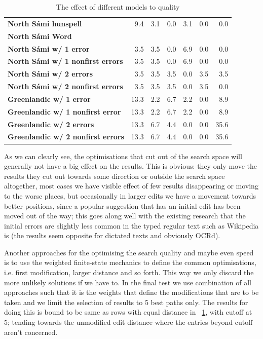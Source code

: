 \documentclass[a4paper,12pt]{article}
\begin{document}
\begin{table}
\begin{tabular}{|l|r|r|r|r|r|r|}
        \bf North Sámi hunspell & 9.4 & 3.1 & 0.0 & 3.1 & 0.0 & 0.0 \\
            \bf North Sámi Word & & \\
        \hline
        \bf North Sámi w/ 1 error & 3.5 & 3.5 & 0.0 & 6.9 & 0.0 & 0.0 \\
        \bf North Sámi w/ 1 nonfirst errors & 3.5 & 3.5 & 0.0 & 6.9 & 0.0 & 0.0\\
        \bf North Sámi w/ 2 errors & 3.5 & 3.5 & 3.5 & 0.0 & 3.5 & 3.5 \\
        \bf North Sámi w/ 2 nonfirst errors & 3.5 & 3.5 & 3.5 & 0.0 & 3.5 & 0.0\\
        \hline
          \bf Greenlandic w/ 1 error & 13.3 & 2.2 & 6.7 & 2.2 & 0.0 & 8.9 \\
 \bf Greenlandic w/ 1 nonfirst error & 13.3 & 2.2 & 6.7 & 2.2 & 0.0 & 8.9 \\
         \bf Greenlandic w/ 2 errors & 13.3 & 6.7 & 4.4 & 0.0 & 0.0 & 35.6 \\
\bf Greenlandic w/ 2 nonfirst errors & 13.3 & 6.7 & 4.4 & 0.0 & 0.0 & 35.6 \\
        \hline
    \end{tabular}
    \caption{The effect of different models to quality
    \label{table:quality}}
\end{table}

As we can clearly see, the optimisations that cut out of the search space will
generally not have a big effect on the results. This is obvious: they only move
the results they cut out towards some direction or outside the search space
altogether, most cases we have visible effect of few results disappearing or
moving to the worse places, but occasionally in larger edits we have a movement
towards better positions, since a popular suggestion that has an initial edit
has been moved out of the way; this goes along well with the existing research
that the initial errors are slightly less common in the typed regular text such
as Wikipedia is (the results seem opposite for dictated texts and obviously
OCRd).

Another approaches for the optimising the search quality and maybe even speed
is to use the weighted finite-state mechanics to define the common
optimisations, i.e. first modification, larger distance and so forth. This way
we only discard the more unlikely solutions if we have to. In the final test we
use combination of all approaches such that it is the weights that define the
modifications that are to be taken and we limit the selection of results to 5
best paths only. The results for doing this is bound to be same as rows with
equal distance in ~\ref{table:quality}, with cutoff at 5; tending
towards the unmodified edit distance where the entries beyond cutoff aren't
concerned.
\end{document}
